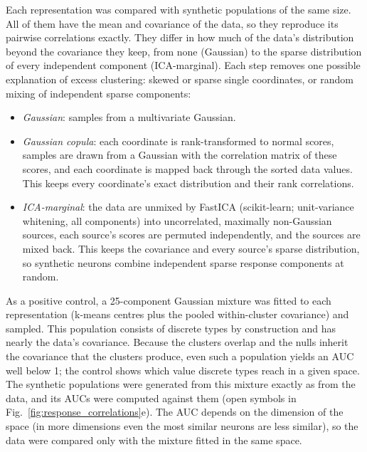 \documentclass[10pt,lineno]{elife}
\begin{document}
Each representation was compared with synthetic populations of the same size. All of them have the mean and covariance of the data, so they reproduce its pairwise correlations exactly. They differ in how much of the data's distribution beyond the covariance they keep, from none (Gaussian) to the sparse distribution of every independent component (ICA-marginal). Each step removes one possible explanation of excess clustering: skewed or sparse single coordinates, or random mixing of independent sparse components:
\begin{itemize}
\item \textit{Gaussian}: samples from a multivariate Gaussian.
\item \textit{Gaussian copula}: each coordinate is rank-transformed to normal scores, samples are drawn from a Gaussian with the correlation matrix of these scores, and each coordinate is mapped back through the sorted data values. This keeps every coordinate's exact distribution and their rank correlations.
\item \textit{ICA-marginal}: the data are unmixed by FastICA (scikit-learn; unit-variance whitening, all components) into uncorrelated, maximally non-Gaussian sources, each source's scores are permuted independently, and the sources are mixed back. This keeps the covariance and every source's sparse distribution, so synthetic neurons combine independent sparse response components at random.
\end{itemize}
As a positive control, a 25-component Gaussian mixture was fitted to each representation (k-means centres plus the pooled within-cluster covariance) and sampled. This population consists of discrete types by construction and has nearly the data's covariance. Because the clusters overlap and the nulls inherit the covariance that the clusters produce, even such a population yields an AUC well below 1; the control shows which value discrete types reach in a given space. The synthetic populations were generated from this mixture exactly as from the data, and its AUCs were computed against them (open symbols in Fig.~\ref{fig:response_correlations}e). The AUC depends on the dimension of the space (in more dimensions even the most similar neurons are less similar), so the data were compared only with the mixture fitted in the same space.
\end{document}
